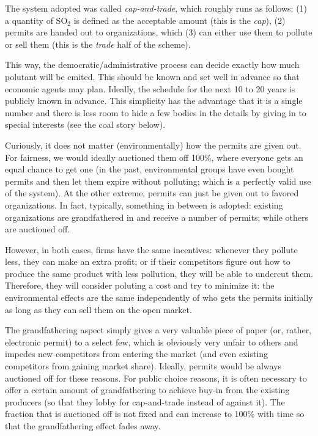 The system adopted was called \emph{cap-and-trade}, which roughly runs as
follows: (1) a quantity of SO${}_2$ is defined as the acceptable amount (this
is the \emph{cap}), (2) permits are handed out to organizations, which (3) can
either use them to pollute or sell them (this is the \emph{trade} half of the
scheme).

This way, the democratic/administrative process can decide exactly how much
polutant will be emited. This should be known and set well in advance so that
economic agents may plan. Ideally, the schedule for the next 10 to 20 years
is publicly known in advance. This simplicity has the advantage that it is a
single number and there is less room to hide a few bodies in the details by
giving in to special interests (see the coal story below).

Curiously, it does not matter (environmentally) how the permits are given out.
For fairness, we would ideally auctioned them off 100\%, where everyone gets an
equal chance to get one (in the past, environmental groups have even bought
permits and then let them expire without polluting; which is a perfectly valid
use of the system). At the other extreme, permits can just be given out to
favored organizations. In fact, typically, something in between is adopted:
existing organizations are grandfathered in and receive a number of permits;
while others are auctioned off.

However, in both cases, firms have the same incentives: whenever they pollute
less, they can make an extra profit; or if their competitors figure out how to
produce the same product with less pollution, they will be able to undercut
them. Therefore, they will consider poluting a cost and try to minimize it: the
environmental effects are the same independently of who gets the permits
initially as long as they can sell them on the open market.

The grandfathering aspect simply gives a very valuable piece of paper (or,
rather, electronic permit) to a select few, which is obviously very unfair to
others and impedes new competitors from entering the market (and even existing
competitors from gaining market share). Ideally, permits would be always
auctioned off for these reasons. For public choice reasons, it is often
necessary to offer a certain amount of grandfathering to achieve buy-in from
the existing producers (so that they lobby for cap-and-trade instead of against
it). The fraction that is auctioned off is not fixed and can increase to 100\%
with time so that the grandfathering effect fades away.

